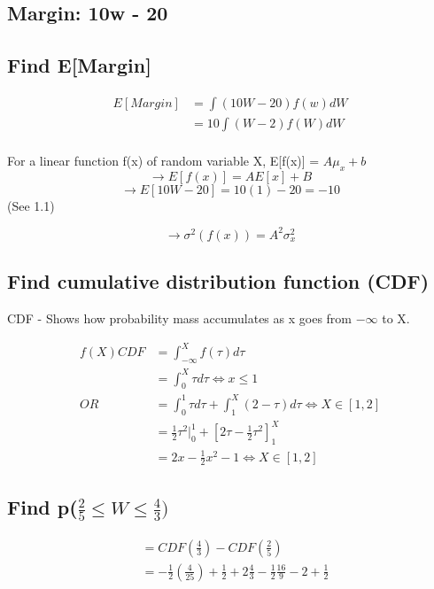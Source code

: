 \documentclass[]{article}
\begin{document}
		\subsection{Margin: 10w - 20}
		\subsection{Find E[Margin]}
			\begin{align*}
				E[Margin] &= \int(10W-20)f(w)dW \\
				&= 10\int(W-2)f(W)dW \\
			\end{align*}
	
			For a linear function f(x) of random variable X,
			E[f(x)] = $A\mu_x + b$ $$\to E[f(x)] = AE[x] + B$$
			$$\to E[10W - 20] = 10(1) - 20 = -10$$ (See 1.1)
	
			$$\to \sigma^2(f(x)) = A^2\sigma_x^2$$
	
	\pagebreak
		\subsection{Find cumulative distribution function (CDF)}
			CDF - Shows how probability mass accumulates as x goes from $-\infty$ to X.
	
			\begin{align*}
				f(X) CDF &= \int_{-\infty}^Xf(\tau)d\tau\\
				         &= \int_0^X\tau d\tau \iff x\leq 1 \\
				     OR\ &= \int_0^1\tau d\tau + \int_1^X (2-\tau )d\tau \iff X\in [1,2] \\
				         &= \frac{1}{2}\tau^2|_0^1 + [2\tau - \frac{1}{2}\tau^2]^X_1 \\
				         &= 2x - \frac{1}{2}x^2 - 1 \iff X\in [1,2]
			\end{align*}
	
	\subsection{Find p($\frac{2}{5}\leq W \leq \frac{4}{3})$}
		\begin{align*}
			&= CDF(\frac{4}{3}) - CDF(\frac{2}{5}) \\
			&= -\frac{1}{2}(\frac{4}{25}) + \frac{1}{2} + 2\frac{4}{3} - \frac{1}{2}\frac{16}{9} - 2 + \frac{1}{2} 
		\end{align*}
	
\end{document}
